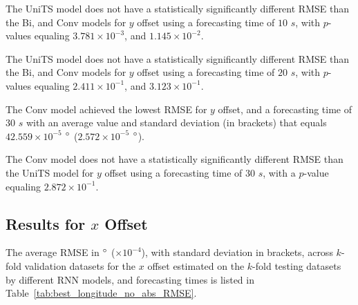 \documentclass[preprint,12pt]{elsarticle}
\begin{document}
The UniTS model does not have a statistically significantly different RMSE than the Bi, and Conv models for $y$ offset using a forecasting time of $10$ $s$, with $p$-values equaling $3.781 \times 10^{-3}$, and $1.145 \times 10^{-2}$.

The UniTS model does not have a statistically significantly different RMSE than the Bi, and Conv models for $y$ offset using a forecasting time of $20$ $s$, with $p$-values equaling $2.411 \times 10^{-1}$, and $3.123 \times 10^{-1}$.

The Conv model achieved the lowest RMSE for $y$ offset, and a forecasting time of $30$ $s$ with an average value and standard deviation (in brackets) that equals $42.559 \times 10^{-5}$ $\degree$ ($2.572 \times 10^{-5}$ $\degree$).

The Conv model does not have a statistically significantly different RMSE than the UniTS model for $y$ offset using a forecasting time of $30$ $s$, with a $p$-value equaling $2.872 \times 10^{-1}$.

\subsection{Results for $x$ Offset}

The average RMSE in $\degree$ ($\times 10^{-4}$), with standard deviation in brackets, across $k$-fold validation datasets for the $x$ offset estimated on the $k$-fold testing datasets by different RNN models, and forecasting times is listed in Table~\ref{tab:best_longitude_no_abs_RMSE}.
\end{document}
